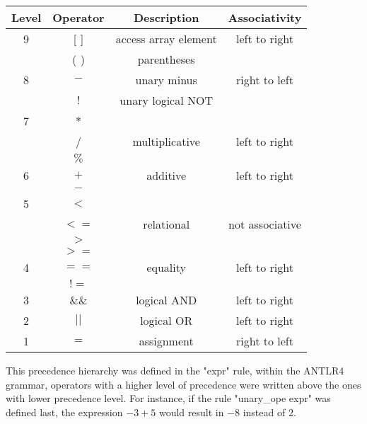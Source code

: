 \documentclass[12pt]{article}
\begin{document}
\begin{table}[htb]
\centering
\begin{tabular}{| c | c | c | c |} 
 \hline
Level & Operator & Description & Associativity        \\ \hline
 9    & [ ]      & access array element & left to right \\ 
      & ( )      & parentheses          &  \\ \hline\hline
          
 8    & $- $     & unary minus          & right to left \\ 
      & $!$      & unary logical NOT    & \\ \hline\hline
      
 7    & $*$      &                      & \\ 
      & /        & multiplicative       & left to right \\
      & $\%$     &                      & \\ \hline\hline
      
 6    & $+$      & additive             & left to right\\
      & $-$      &                      & \\  \hline\hline
 
 5    & $< $     &                      & \\
      & $<=$     & relational           & not associative\\
      & $> $     &                      & \\
      & $>=$     &                      &  \\  \hline\hline 
      
 4    & $==$     & equality             & left to right\\
      & $!=$     &                      & \\ \hline\hline
      
 3    & $\&\&$   & logical AND          & left to right\\   \hline\hline
 
 2    & $||$     & logical OR           & left to right\\   \hline\hline
 
 1    & $=$      & assignment           & right to left \\   \hline
 
\end{tabular}
\end{table}
This precedence hierarchy was defined in the "expr" rule, within the ANTLR4 grammar, operators with a higher level of precedence were written above the ones with lower precedence level. For instance, if the rule "unary\_ope expr" was defined last, the expression $-3 + 5$ would result in $-8$ instead of $2$.


\end{document}
